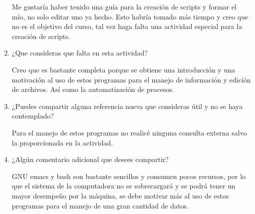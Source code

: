 \documentclass{article}
\begin{document}
\begin{enumerate}
Me gustaría haber tenido una guía para la creación de scripts y formar el mío, no solo editar uno ya hecho. Esto habría tomado más tiempo y creo que no es el objetivo del curso, tal vez haga falta una actividad especial para la creación de scripts.

\item{¿Que consideras que falta en esta actividad? }

Creo que es bastante completa porque se obtiene una introducción y una motivación al uso de estos programas para el manejo de información y edición de archivos. Así como la automatización de procesos.

\item{¿Puedes compartir alguna referencia nueva que consideras útil y no se haya contemplado?}

Para el manejo de estos programas no realicé ninguna consulta externa salvo la proporcionada en la actividad.

\item{¿Algún comentario adicional que desees compartir?}

GNU emacs y bash son bastante sencillos y consumen pocos recursos, por lo que el sistema de la computadora no se sobrecargará y se podrá tener un mayor desempeño por la máquina, se debe motivar más al uso de estos programas para el manejo de una gran cantidad de datos.

\end{enumerate}
\end{document}
